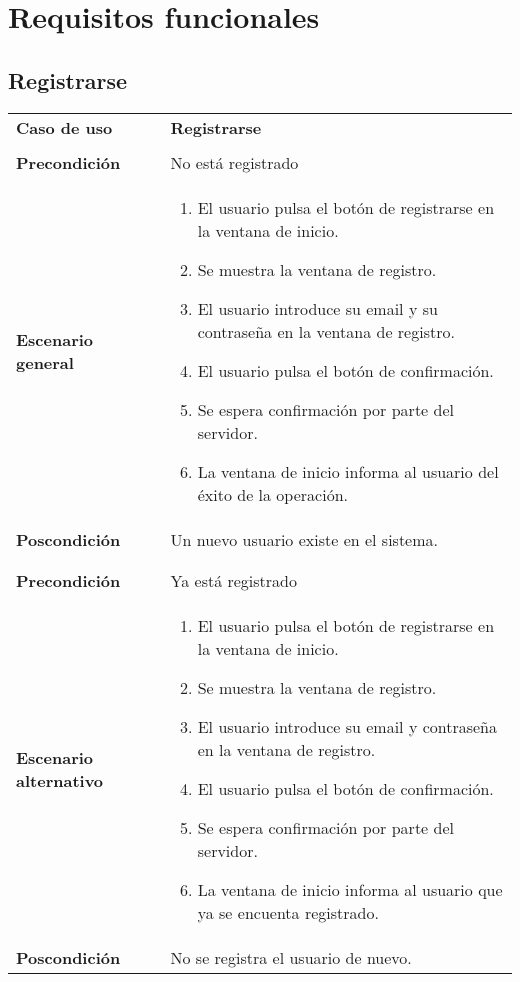 \section{Requisitos funcionales}

\subsection{Registrarse}

{\footnotesize
\begin{tabularx}{0.95\textwidth}{p{}|X}

\textbf{Caso de uso} & \textbf{Registrarse} \\
& \\
\textbf{Precondición} & No está registrado \\

\textbf{Escenario general} & \begin{enumerate}
\item El usuario pulsa el botón de registrarse en la ventana de inicio.
\item Se muestra la ventana de registro.
\item El usuario introduce su email y su contraseña en la ventana de registro.
\item El usuario pulsa el botón de confirmación.
\item Se espera confirmación por parte del servidor.
\item La ventana de inicio informa al usuario del éxito de la operación.
\end{enumerate} \\

\textbf{Poscondición} & Un nuevo usuario existe en el sistema.\\
& \\
& \\
\textbf{Precondición} & Ya está registrado\\
\textbf{Escenario alternativo} & \begin{enumerate}
 \item El usuario pulsa el botón de registrarse en la ventana de inicio.
\item Se muestra la ventana de registro.
\item El usuario introduce su email y contraseña en la ventana de registro.
\item El usuario pulsa el botón de confirmación.
\item Se espera confirmación por parte del servidor.
\item La ventana de inicio informa al usuario que ya se encuenta registrado.
\end{enumerate}\\
\textbf{Poscondición}& No se registra el usuario de nuevo.\\

\end{tabularx}
}

